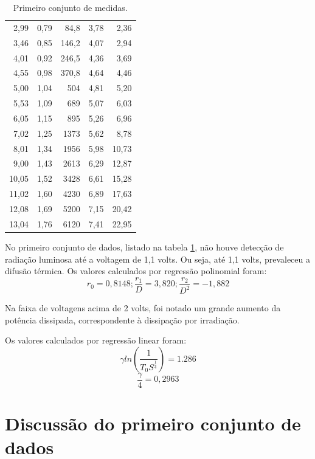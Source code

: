 \documentclass[brazilian,12pt,a4paper,final]{article}
\begin{document}
\begin{table}[htbp]
\begin{tabular}{|r|r|r|r|r|}
2,99    &       0,79    &       84,8    &       3,78    &       2,36    \\
3,46    &       0,85    &       146,2   &       4,07    &       2,94    \\
4,01    &       0,92    &       246,5   &       4,36    &       3,69    \\
4,55    &       0,98    &       370,8   &       4,64    &       4,46    \\
5,00    &       1,04    &       504     &       4,81    &       5,20    \\
5,53    &       1,09    &       689     &       5,07    &       6,03    \\
6,05    &       1,15    &       895     &       5,26    &       6,96    \\
7,02    &       1,25    &       1373    &       5,62    &       8,78    \\
8,01    &       1,34    &       1956    &       5,98    &       10,73   \\
9,00    &       1,43    &       2613    &       6,29    &       12,87   \\
10,05   &       1,52    &       3428    &       6,61    &       15,28   \\
11,02   &       1,60    &       4230    &       6,89    &       17,63   \\
12,08   &       1,69    &       5200    &       7,15    &       20,42   \\
13,04   &       1,76    &       6120    &       7,41    &       22,95   \\
 \hline
 \end{tabular}
 \caption{Primeiro conjunto de medidas.}
 \label{tabdados1}
\end{table}

No primeiro conjunto de dados, listado na tabela \ref{tabdados1}, 
não houve detecção de radiação luminosa até a voltagem de 1,1 volts.
Ou seja, até 1,1 volts, prevaleceu a difusão térmica.
Os valores calculados por regressão polinomial foram:
$$r_0=0,8148; \frac{r_1}{D}=3,820; \frac{r_2}{D^2}=-1,882$$

Na faixa de voltagens acima de 2 volts, foi notado um grande aumento da
potência dissipada, correspondente à dissipação por irradiação.

Os valores calculados por regressão linear foram:
$$\gamma ln(\frac{1}{T_0S^\frac{1}{4}}) = 1.286$$
$$\frac{\gamma}{4}=0,2963$$

\section{Discussão do primeiro conjunto de dados}
\end{document}
